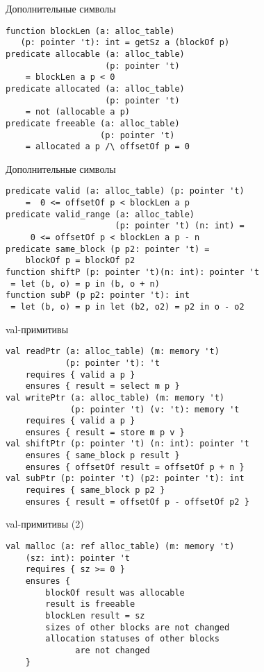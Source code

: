 \documentclass[hyperref={unicode=true}]{beamer}
\begin{document}
    \begin{frame}[fragile]{Дополнительные символы}
    \begin{lstlisting}
function blockLen (a: alloc_table)
   (p: pointer 't): int = getSz a (blockOf p)
predicate allocable (a: alloc_table)
                    (p: pointer 't)
    = blockLen a p < 0
predicate allocated (a: alloc_table)
                    (p: pointer 't)
    = not (allocable a p)
predicate freeable (a: alloc_table)
                   (p: pointer 't)
    = allocated a p /\ offsetOf p = 0
    \end{lstlisting}
    \end{frame}

    \begin{frame}[fragile]{Дополнительные символы}
    \begin{lstlisting}
predicate valid (a: alloc_table) (p: pointer 't)
    =  0 <= offsetOf p < blockLen a p
predicate valid_range (a: alloc_table)
                      (p: pointer 't) (n: int) =
     0 <= offsetOf p < blockLen a p - n
predicate same_block (p p2: pointer 't) =
    blockOf p = blockOf p2
function shiftP (p: pointer 't)(n: int): pointer 't
 = let (b, o) = p in (b, o + n)
function subP (p p2: pointer 't): int
 = let (b, o) = p in let (b2, o2) = p2 in o - o2
    \end{lstlisting}
    \end{frame}

    \begin{frame}[fragile]{val-примитивы}
    \begin{lstlisting}
val readPtr (a: alloc_table) (m: memory 't)
            (p: pointer 't): 't
    requires { valid a p }
    ensures { result = select m p }
val writePtr (a: alloc_table) (m: memory 't)
             (p: pointer 't) (v: 't): memory 't
    requires { valid a p }
    ensures { result = store m p v }
val shiftPtr (p: pointer 't) (n: int): pointer 't
    ensures { same_block p result }
    ensures { offsetOf result = offsetOf p + n }
val subPtr (p: pointer 't) (p2: pointer 't): int
    requires { same_block p p2 }
    ensures { result = offsetOf p - offsetOf p2 }
    \end{lstlisting}
    \end{frame}

    \begin{frame}[fragile]{val-примитивы (2)}
    \begin{lstlisting}
val malloc (a: ref alloc_table) (m: memory 't)
    (sz: int): pointer 't
    requires { sz >= 0 }
    ensures {
        blockOf result was allocable
        result is freeable
        blockLen result = sz
        sizes of other blocks are not changed
        allocation statuses of other blocks
              are not changed
    }
    \end{lstlisting}
    \end{frame}
\end{document}
